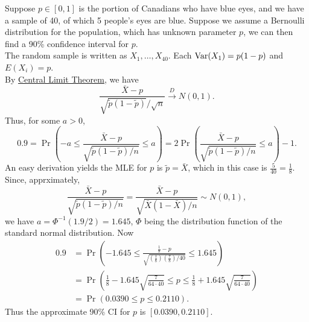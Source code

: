 \documentclass[11pt,fleqn]{book} %
\begin{document}
\begin{example} \label{eg:812}
Suppose \(p \in [0, 1]\) is the portion of Canadians who have blue eyes, and we have a sample of 40, of which 5 people's eyes are blue. Suppose we assume a Bernoulli distribution for the population, which has unknown parameter \(p\), we can then find a 90\% confidence interval for \(p\). \\
\indent The random sample is written as \(X_1, \ldots, X_{40}\). Each \(\operatorname{Var}(X_1) = p(1 - p)\) and \(E(X_i) = p\). \\
\indent By \hyperref[thm:443]{Central Limit Theorem}, we have
\[
\frac{\bar{X} - p}{\sqrt{\tilde{p}(1 - \tilde{p})} / \sqrt{n}} \xrightarrow{D} N(0, 1).
\]
\indent Thus, for some \(a > 0\),
\[
0.9 = \Pr\left(-a \leq \frac{\bar{X} - p}{\sqrt{\tilde{p}(1 - \tilde{p})/n}} \leq a\right) = 2\Pr\left(\frac{\bar{X} - p}{\sqrt{\tilde{p}(1 - \tilde{p})/n}} \leq a\right) - 1.
\]
\indent An easy derivation yields the MLE for \(p\) is \(\tilde{p} = \bar{X}\), which in this case is \(\frac{5}{40} = \frac18\). \\
\indent Since, apprximately,
\[
\frac{\bar{X} - p}{\sqrt{\tilde{p}(1 - \tilde{p}) / n}} = \frac{\bar{X} - p}{\sqrt{\bar{X}(1 - \bar{X}) / n}} \sim N(0, 1),
\]
we have \(a = \Phi^{-1}(1.9 / 2) = 1.645\), \(\Phi\) being the distribution function of the standard normal distribution. Now
\[
\begin{aligned}
0.9 &= \Pr\left(-1.645 \leq \frac{\frac18 - p}{\sqrt{\left(\frac18\right)\left(\frac78\right)/40}} \leq 1.645\right) \\
&= \Pr\left(\frac18 - 1.645\sqrt{\frac{7}{64 \cdot 40}} \leq p \leq \frac18 + 1.645\sqrt{\frac{7}{64\cdot40}}\right) \\
&= \Pr(0.0390 \leq p \leq 0.2110).
\end{aligned}
\]
\indent Thus the approximate 90\% CI for \(p\) is \([0.0390, 0.2110]\).
\end{example}
\end{document}
